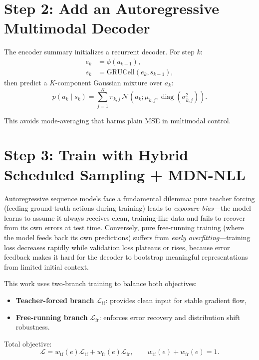\documentclass{article}
\begin{document}
\section{Step 2: Add an Autoregressive Multimodal Decoder}
The encoder summary initializes a recurrent decoder. For step $k$:
\begin{align}
e_k &= \phi(a_{k-1}), \\
s_k &= \mathrm{GRUCell}(e_k,s_{k-1}),
\end{align}
then predict a $K$-component Gaussian mixture over $a_k$:
\begin{equation}
p(a_k\mid s_k)=\sum_{j=1}^{K}\pi_{k,j}\,\mathcal{N}\!\left(a_k;\mu_{k,j},\operatorname{diag}(\sigma^2_{k,j})\right).
\end{equation}

This avoids mode-averaging that harms plain MSE in multimodal control.

\section{Step 3: Train with Hybrid Scheduled Sampling + MDN-NLL}
Autoregressive sequence models face a fundamental dilemma: pure teacher forcing (feeding ground-truth actions during training) leads to \emph{exposure bias}---the model learns to assume it always receives clean, training-like data and fails to recover from its own errors at test time. Conversely, pure free-running training (where the model feeds back its own predictions) suffers from \emph{early overfitting}---training loss decreases rapidly while validation loss plateaus or rises, because error feedback makes it hard for the decoder to bootstrap meaningful representations from limited initial context.

This work uses two-branch training to balance both objectives:
\begin{itemize}
    \item \textbf{Teacher-forced branch} $\mathcal{L}_{\mathrm{tf}}$: provides clean input for stable gradient flow,
    \item \textbf{Free-running branch} $\mathcal{L}_{\mathrm{fr}}$: enforces error recovery and distribution shift robustness.
\end{itemize}
Total objective:
\begin{equation}
\mathcal{L}=w_{\mathrm{tf}}(e)\mathcal{L}_{\mathrm{tf}}+w_{\mathrm{fr}}(e)\mathcal{L}_{\mathrm{fr}},\qquad
w_{\mathrm{tf}}(e)+w_{\mathrm{fr}}(e)=1.
\end{equation}
\end{document}
